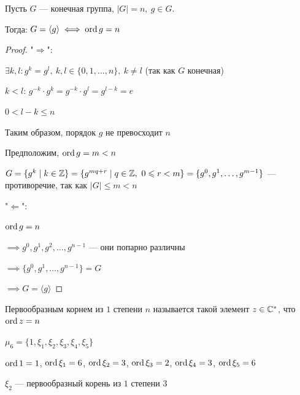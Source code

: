 \begin{theorem-non}
    Пусть $G$ --- конечная группа, $|G| = n,~g \in G$.

    Тогда: $G = \langle g \rangle \iff \operatorname{ord} g = n$
\end{theorem-non}

\begin{proof}
    "$\Rightarrow$":

    $\exists k, l: g^k = g^l,~k, l \in \{0, 1, \ldots, n\},~k \neq l$ (так как $G$ конечная)

    $k < l$: $g^{-k} \cdot g^k = g^{-k} \cdot g^l = g^{l - k} = e$

    $0 < l - k \leq n$

    Таким образом, порядок $g$ не превосходит $n$

    Предположим, $\operatorname{ord} g = m < n$

    $G = \{ g^k \mid k \in \mathbb{Z} \} = \{ g^{mq + r} \mid q \in \mathbb{Z},~0 \leqslant r < m \} = \{g^0, g^1, \ldots, g^{m-1}\}$ --- противоречие, так как $|G| \leq m < n$

    "$\Leftarrow$":

    $\operatorname{ord} g = n$

    $\implies g^0, g^1, g^2, \ldots, g^{n - 1}$ --- они попарно различны

    $\implies \{g^0, g^1, \ldots, g^{n - 1}\} = G$

    $\implies G = \langle g \rangle$
\end{proof}

\begin{defn}
    Первообразным корнем из $1$ степени $n$ называется такой элемент $z \in \mathbb{C}^*$, что $\operatorname{ord} z = n$
\end{defn}

\begin{example}
    $\mu_6 = \{1, \xi_1, \xi_2, \xi_3, \xi_4, \xi_5\}$
    
    $\operatorname{ord} 1 = 1$, $\operatorname{ord} \xi_1 = 6$, $\operatorname{ord} \xi_2 = 3$, $\operatorname{ord} \xi_3 = 2$, $\operatorname{ord} \xi_4 = 3$, $\operatorname{ord} \xi_5 = 6$

    $\xi_2$ --- первообразный корень из $1$ степени $3$
\end{example}